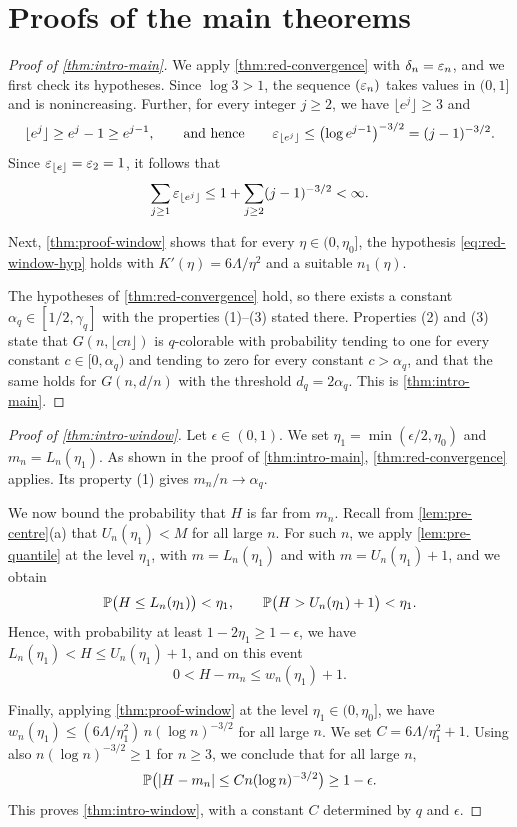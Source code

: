 \section{Proofs of the main theorems}\label{sec:proof-main}

\begin{proof}[Proof of \cref{thm:intro-main}]
We apply \cref{thm:red-convergence} with $\delta_n = \varepsilon_n$, and we first check its hypotheses. Since $\log 3 > 1$, the sequence $(\varepsilon_n)$ takes values in $(0, 1]$ and is nonincreasing. Further, for every integer $j \ge 2$, we have $\lfloor e^j \rfloor \ge 3$ and
\[
\lfloor e^j \rfloor \ge e^j - 1 \ge e^{j - 1}, \qquad \text{and hence} \qquad \varepsilon_{\lfloor e^j \rfloor} \le \bigl( \log e^{j - 1} \bigr)^{-3/2} = (j - 1)^{-3/2}.
\]
Since $\varepsilon_{\lfloor e \rfloor} = \varepsilon_2 = 1$, it follows that
\[
\sum_{j \ge 1} \varepsilon_{\lfloor e^j \rfloor} \le 1 + \sum_{j \ge 2} (j - 1)^{-3/2} < \infty.
\]

Next, \cref{thm:proof-window} shows that for every $\eta \in (0, \eta_0]$, the hypothesis \eqref{eq:red-window-hyp} holds with $K'(\eta) = 6 \Lambda / \eta^2$ and a suitable $n_1(\eta)$.

The hypotheses of \cref{thm:red-convergence} hold, so there exists a constant $\alpha_q \in [1/2, \gamma_q]$ with the properties (1)--(3) stated there. Properties (2) and (3) state that $G(n, \lfloor cn \rfloor)$ is $q$-colorable with probability tending to one for every constant $c \in [0, \alpha_q)$ and tending to zero for every constant $c > \alpha_q$, and that the same holds for $G(n, d/n)$ with the threshold $d_q = 2 \alpha_q$. This is \cref{thm:intro-main}.
\end{proof}

\begin{proof}[Proof of \cref{thm:intro-window}]
Let $\epsilon \in (0, 1)$. We set $\eta_1 = \min(\epsilon / 2, \eta_0)$ and $m_n = L_n(\eta_1)$. As shown in the proof of \cref{thm:intro-main}, \cref{thm:red-convergence} applies. Its property (1) gives $m_n / n \to \alpha_q$.

We now bound the probability that $H$ is far from $m_n$. Recall from \cref{lem:pre-centre}(a) that $U_n(\eta_1) < M$ for all large $n$. For such $n$, we apply \cref{lem:pre-quantile} at the level $\eta_1$, with $m = L_n(\eta_1)$ and with $m = U_n(\eta_1) + 1$, and we obtain
\[
\mathbb P \bigl( H \le L_n(\eta_1) \bigr) < \eta_1, \qquad \mathbb P \bigl( H > U_n(\eta_1) + 1 \bigr) < \eta_1.
\]
Hence, with probability at least $1 - 2 \eta_1 \ge 1 - \epsilon$, we have $L_n(\eta_1) < H \le U_n(\eta_1) + 1$, and on this event
\[
0 < H - m_n \le w_n(\eta_1) + 1.
\]

Finally, applying \cref{thm:proof-window} at the level $\eta_1 \in (0, \eta_0]$, we have $w_n(\eta_1) \le (6 \Lambda / \eta_1^2) \, n (\log n)^{-3/2}$ for all large $n$. We set $C = 6 \Lambda / \eta_1^2 + 1$. Using also $n (\log n)^{-3/2} \ge 1$ for $n \ge 3$, we conclude that for all large $n$,
\[
\mathbb P \bigl( \left|H - m_n\right| \le C n (\log n)^{-3/2} \bigr) \ge 1 - \epsilon.
\]
This proves \cref{thm:intro-window}, with a constant $C$ determined by $q$ and $\epsilon$.
\end{proof}

